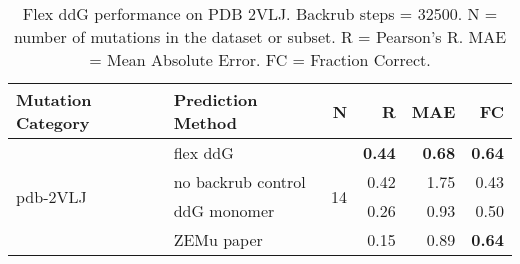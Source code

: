 \begin{table}
  \begin{tabular}{llrrrr}
\toprule
Mutation Category &   Prediction Method &   N &    R &  MAE &   FC \\
\midrule
 \multirow{ 4}{*}{pdb-2VLJ} & flex ddG & \multirow{ 4}{*}{14} & \textbf{0.44} & \textbf{0.68} & \textbf{0.64}  \\
 & no backrub control & & 0.42 & 1.75 & 0.43  \\
 & ddG monomer & & 0.26 & 0.93 & 0.50  \\
 & ZEMu paper & & 0.15 & 0.89 & \textbf{0.64}  \\
\bottomrule
\end{tabular}
  \caption[Flex ddG performance on PDB 2VLJ]{
    Flex ddG performance on PDB 2VLJ. Backrub steps = 32500. N = number of mutations in the dataset or subset. R = Pearson's R. MAE = Mean Absolute Error. FC = Fraction Correct.
  } \label{tab:table-pdb-2VLJ}
\end{table}
